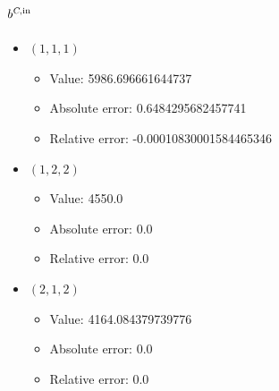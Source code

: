 \documentclass{article}%
\begin{document}
\subsection{$b^{\textsl{C},\text{in}}$}%
\begin{itemize}%
	\item $(1, 1, 1)$%
	\begin{itemize}%
		\item Value: 5986.696661644737%
		\item Absolute error: 0.6484295682457741%
		\item Relative error: -0.00010830001584465346%
	\end{itemize}%
	\item $(1, 2, 2)$%
	\begin{itemize}%
		\item Value: 4550.0%
		\item Absolute error: 0.0%
		\item Relative error: 0.0%
	\end{itemize}%
	\item $(2, 1, 2)$%
	\begin{itemize}%
		\item Value: 4164.084379739776%
		\item Absolute error: 0.0%
		\item Relative error: 0.0%
	\end{itemize}%
\end{itemize}%
\end{document}

